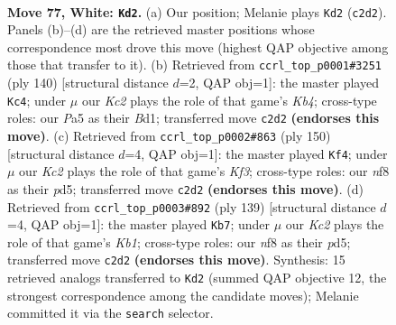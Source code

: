 \documentclass[11pt]{article}
\begin{document}
\clearpage

\begin{figure}[p]\centering
\begin{subfigure}{0.46\textwidth}\centering
\resizebox{\linewidth}{!}{%
\newchessgame
\chessboard[
  setfen={5n2/8/3k4/P7/8/7r/2K5/6R1 w - - 1 77},
  showmover=false,
  pgfstyle=straightmove, color=movearrow, markmove={c2-d2}
]}
\caption{}
\end{subfigure}\hfill
\begin{subfigure}{0.46\textwidth}\centering
\resizebox{\linewidth}{!}{%
\newchessgame
\chessboard[
  setfen={r7/8/4k3/8/1K2n3/8/7R/3B4 w - - 7 71},
  showmover=false,
  pgfstyle=straightmove, color=movearrow, markmove={b4-c4}
]}
\caption{}
\end{subfigure}
\\[4pt]
\begin{subfigure}{0.46\textwidth}\centering
\resizebox{\linewidth}{!}{%
\newchessgame
\chessboard[
  setfen={8/3k4/8/3p1P2/8/5K2/7r/2R5 w - - 1 76},
  showmover=false,
  pgfstyle=straightmove, color=movearrow, markmove={f3-f4}
]}
\caption{}
\end{subfigure}\hfill
\begin{subfigure}{0.46\textwidth}\centering
\resizebox{\linewidth}{!}{%
\newchessgame
\chessboard[
  setfen={1k6/8/3p4/3P4/4r3/6K1/2R5/8 b - - 0 70},
  showmover=false,
  pgfstyle=straightmove, color=movearrow, markmove={b8-b7}
]}
\caption{}
\end{subfigure}
\caption{\textbf{Move 77, White: \texttt{Kd2}.} (a) Our position; Melanie plays \texttt{Kd2} (\texttt{c2d2}). Panels (b)--(d) are the retrieved master positions whose correspondence most drove this move (highest QAP objective among those that transfer to it). (b) Retrieved from \texttt{ccrl\_top\_p0001\#3251} (ply 140) [structural distance $d$=2, QAP obj=1]: the master played \texttt{Kc4}; under $\mu$ our \emph{Kc2} plays the role of that game's \emph{Kb4}; cross-type roles: our \emph{P}a5 as their \emph{B}d1; transferred move \texttt{c2d2} \textbf{(endorses this move)}. (c) Retrieved from \texttt{ccrl\_top\_p0002\#863} (ply 150) [structural distance $d$=4, QAP obj=1]: the master played \texttt{Kf4}; under $\mu$ our \emph{Kc2} plays the role of that game's \emph{Kf3}; cross-type roles: our \emph{n}f8 as their \emph{p}d5; transferred move \texttt{c2d2} \textbf{(endorses this move)}. (d) Retrieved from \texttt{ccrl\_top\_p0003\#892} (ply 139) [structural distance $d$=4, QAP obj=1]: the master played \texttt{Kb7}; under $\mu$ our \emph{Kc2} plays the role of that game's \emph{Kb1}; cross-type roles: our \emph{n}f8 as their \emph{p}d5; transferred move \texttt{c2d2} \textbf{(endorses this move)}. Synthesis: 15 retrieved analogs transferred to \texttt{Kd2} (summed QAP objective 12, the strongest correspondence among the candidate moves); Melanie committed it via the \texttt{search} selector.}
\label{fig:thought-m152}
\end{figure}
\end{document}
